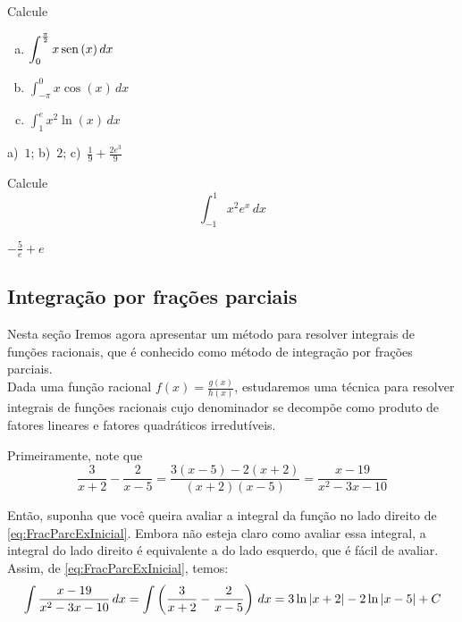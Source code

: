 \cleardoublepage\documentclass[../main.tex]{subfiles}
\begin{document}
\begin{exer}
  Calcule
   \begin{multicols}{3}
  \begin{enumerate}[a)]
  \item $\displaystyle \int_0^{\frac{\pi}{2}} x\operatorname{sen}\,(x)\,dx$
  \item $\displaystyle \int_{-\pi}^{0} x\cos(x)\,dx$
  \item $\displaystyle \int_1^e x^2\ln(x)\,dx$
  \end{enumerate}\end{multicols}
\end{exer}
\begin{resp}
  a)~$1$; b)~$2$;  c)~$\displaystyle \frac{1}{9}+\frac{2e^3}{9}$
\end{resp}

\begin{exer}
  Calcule
  \begin{equation*}
    \int_{-1}^1 x^2e^x\,dx
  \end{equation*}
\end{exer}
\begin{resp}
  $-\frac{5}{e}+e$
\end{resp}

\subsection{Integração por frações parciais}\hypertarget{FracParc}{}\label{subsec:FracParciais}
Nesta seção Iremos agora apresentar um método para resolver integrais de funções
racionais, que é conhecido como método de integração por frações parciais.\\

Dada uma função racional $f (x) =\frac{g(x)}{h(x)}$, estudaremos uma técnica para resolver integrais de funções racionais cujo denominador se decompõe como produto de fatores lineares e fatores quadráticos irredutíveis.

Primeiramente, note que
\begin{equation}
    \frac{3}{x+2}-\frac{2}{x-5}=\frac{3(x-5)-2(x+2)}{(x+2)(x-5)}=\frac{x-19}{x^2-3x-10}\label{eq:FracParcExInicial}
\end{equation}

Então, suponha que você queira avaliar a integral da função no lado direito de \ref{eq:FracParcExInicial}. Embora não esteja claro como avaliar essa integral, a integral do lado direito é equivalente a do lado esquerdo, que é fácil de avaliar. Assim, de \ref{eq:FracParcExInicial}, temos:
\begin{equation*}
    \int \frac{x-19}{x^2-3x-10} \, dx=\int \left(\frac{3}{x+2}-\frac{2}{x-5}\right) \, dx=3\ln |x+2|-2\ln |x-5|+C
\end{equation*}
\end{document}
